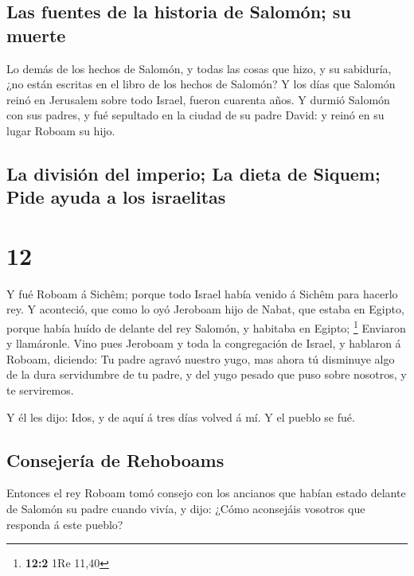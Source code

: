 \hypertarget{las-fuentes-de-la-historia-de-salomuxf3n-su-muerte}{%
\subsection{Las fuentes de la historia de Salomón; su
muerte}\label{las-fuentes-de-la-historia-de-salomuxf3n-su-muerte}}

 Lo demás de los hechos de Salomón, y todas las cosas que
hizo, y su sabiduría, ¿no están escritas en el libro de los hechos de
Salomón?  Y los días que Salomón reinó en Jerusalem sobre
todo Israel, fueron cuarenta años.  Y durmió Salomón con
sus padres, y fué sepultado en la ciudad de su padre David: y reinó en
su lugar Roboam su hijo.

\hypertarget{la-divisiuxf3n-del-imperio-la-dieta-de-siquem-pide-ayuda-a-los-israelitas}{%
\subsection{La división del imperio; La dieta de Siquem; Pide ayuda a
los
israelitas}\label{la-divisiuxf3n-del-imperio-la-dieta-de-siquem-pide-ayuda-a-los-israelitas}}

\hypertarget{section-11}{%
\section{12}\label{section-11}}

 Y fué Roboam á Sichêm; porque todo Israel había venido á
Sichêm para hacerlo rey.  Y aconteció, que como lo oyó
Jeroboam hijo de Nabat, que estaba en Egipto, porque había huído de
delante del rey Salomón, y habitaba en Egipto; \footnote{\textbf{12:2}
  1Re 11,40}  Enviaron y llamáronle. Vino pues Jeroboam y
toda la congregación de Israel, y hablaron á Roboam, diciendo:
 Tu padre agravó nuestro yugo, mas ahora tú disminuye algo
de la dura servidumbre de tu padre, y del yugo pesado que puso sobre
nosotros, y te serviremos.

 Y él les dijo: Idos, y de aquí á tres días volved á mí. Y
el pueblo se fué.

\hypertarget{consejeruxeda-de-rehoboams}{%
\subsection{Consejería de Rehoboams}\label{consejeruxeda-de-rehoboams}}

 Entonces el rey Roboam tomó consejo con los ancianos que
habían estado delante de Salomón su padre cuando vivía, y dijo: ¿Cómo
aconsejáis vosotros que responda á este pueblo?

